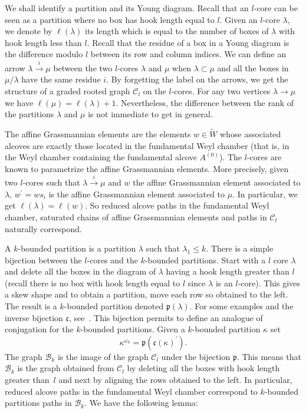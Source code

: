 \documentclass[10pt,a4paper]{amsart}
\theoremstyle{definition}
\begin{document}
We shall identify a partition and its Young diagram. Recall that an $l$-core
can be seen as a partition where no box has hook length equal to $l$. Given an
$l$-core $\lambda$, we denote by $\ell(\lambda)$ its length which is equal to
the number of boxes of $\lambda$ with hook length less than $l$. Recall that
the residue of a box in a Young diagram is the difference modulo $l$ between
its row and column indices. We can define an arrow $\lambda\overset
{i}{\rightarrow}\mu$ between the two $l$-cores $\lambda$ and $\mu$ when
$\lambda\subset\mu$ and all the boxes in $\mu/\lambda$ have the same residue
$i$. By forgetting the label on the arrows, we get the structure of a graded rooted
graph $\mathcal{C}_{l}$ on the $l$-cores. For any two vertices $\lambda
\rightarrow\mu$ we have $\ell(\mu)=\ell(\lambda)+1$. Nevertheless, the
difference between the rank of the partitions $\lambda$ and $\mu$ is not
immediate to get in general.

The affine Grassmannian elements are the elements $w\in\widetilde{W}$ whose
associated alcoves are exactly those located in the fundamental Weyl chamber
(that is, in the Weyl chamber containing the fundamental alcove $A^{(0)}%
$). The $l$-cores are known to parametrize the affine Grassmannian elements.
More precisely, given two $l$-cores such that $\lambda\overset{i}{\rightarrow
}\mu$ and $w$ the affine Grassmannian element associated to $\lambda$,
$w^{\prime}=ws_{i}$ is the affine Grassmannian element associated to $\mu
$. In particular, we get $\ell(\lambda)=\ell(w)$. So reduced alcove paths in
the fundamental Weyl chamber, saturated chains of affine Grassmannian elements
and paths in $\mathcal{C}_{l}$ naturally correspond.


A $k$-bounded partition is a partition $\lambda$ such that $\lambda_{1}\leq
k$. There is a simple bijection between the $l$-cores and the $k$-bounded
partitions. Start with a $l$ core $\lambda$ and delete all the boxes in the
diagram of $\lambda$ having a hook length greater than $l$ (recall there is no
box with hook length equal to $l$ since $\lambda$ is an $l$-core). This gives a
skew shape and to obtain a partition, move each row so obtained to the left.
The result is a $k$-bounded partition denoted $\mathfrak{p}(\lambda)$. For
some examples and the inverse bijection $\mathfrak{c}$, see~\cite[pages~18 and~19]{LLMSSZ}. This bijection permits to define an analogue of conjugation
for the $k$-bounded partitions. Given a $k$-bounded partition $\kappa$ set%
\[
\kappa^{\omega_{k}}=\mathfrak{p}(\mathfrak{c}(\kappa)^{\prime}).
\]
The graph $\mathcal{B}_{k}$ is the image of the graph $\mathcal{C}_{l}$ under
the bijection $\mathfrak{p}$. This means that $\mathcal{B}_{k}$ is the graph
obtained from $\mathcal{C}_{l}$ by deleting all the boxes with hook length
greater than~$l$ and next by aligning the rows obtained to the left. In
particular, reduced alcove paths in the fundamental Weyl chamber correspond to
$k$-bounded partitions paths in $\mathcal{B}_{k}$. We have the following lemma:
\end{document}
